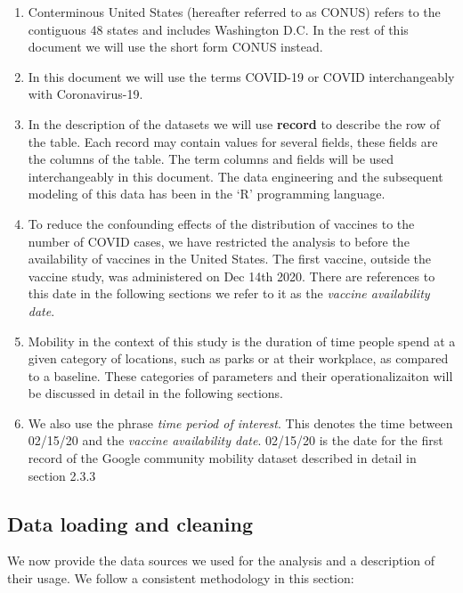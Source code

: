 \documentclass[
]{article}
\providecommand{\tightlist}{%
  \setlength{\itemsep}{0pt}\setlength{\parskip}{0pt}}
\begin{document}
\begin{enumerate}
\def\labelenumi{\arabic{enumi}.}
\tightlist
\item
  Conterminous United States (hereafter referred to as CONUS) refers to
  the contiguous 48 states and includes Washington D.C. In the rest of
  this document we will use the short form CONUS instead.
\item
  In this document we will use the terms COVID-19 or COVID
  interchangeably with Coronavirus-19.
\item
  In the description of the datasets we will use \textbf{record} to
  describe the row of the table. Each record may contain values for
  several fields, these fields are the columns of the table. The term
  columns and fields will be used interchangeably in this document. The
  data engineering and the subsequent modeling of this data has been in
  the `R' programming language.
\item
  To reduce the confounding effects of the distribution of vaccines to
  the number of COVID cases, we have restricted the analysis to before
  the availability of vaccines in the United States. The first vaccine,
  outside the vaccine study, was administered on Dec 14th 2020. There
  are references to this date in the following sections we refer to it
  as the \emph{vaccine availability date}.
\item
  Mobility in the context of this study is the duration of time people
  spend at a given category of locations, such as parks or at their
  workplace, as compared to a baseline. These categories of parameters
  and their operationalizaiton will be discussed in detail in the
  following sections.
\item
  We also use the phrase \emph{time period of interest}. This denotes
  the time between 02/15/20 and the \emph{vaccine availability date}.
  02/15/20 is the date for the first record of the Google community
  mobility dataset described in detail in section 2.3.3
\end{enumerate}

\hypertarget{data-loading-and-cleaning}{%
\subsection{Data loading and cleaning}\label{data-loading-and-cleaning}}

We now provide the data sources we used for the analysis and a
description of their usage. We follow a consistent methodology in this
section:
\end{document}
